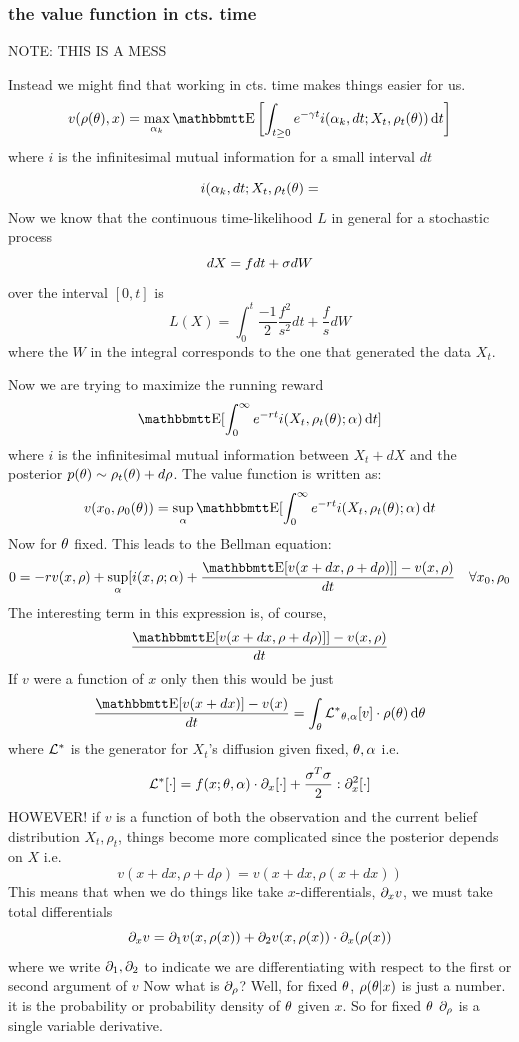 \documentclass{article}
\begin{document}
\subsubsection{the value function in cts. time}
NOTE: THIS IS A MESS

Instead we might find that working in cts. time makes things easier for us. 
\begin{equation}
v(\rho(\th), x) =
\max_{\a_k} \Exp\left[ \int_{t \geq 0} e^{-\g t}  i(\a_k, dt; X_t, \rho_t(\th))
\intd{t}\right]
\label{eq:mutual_info_objective_cts_time}
\end{equation}
where $i$ is the infinitesimal mutual information for a small interval $dt$

$$
i({\alpha}_k, dt; X_t, \rho_t({\theta}) = 
$$
Now we know that the continuous time-likelihood $L$ in general for a stochastic
process
$$
dX = f dt + {\sigma } dW
$$
over the interval $[0,t]$ is
$$
L(X) = \int_0^t \frac {-1}{2} \frac{f^2}{s^2} dt + \frac{f}{s}dW
$$
where the $W$ in the integral corresponds to the one that generated the data
$X_t$.

Now we are trying to maximize the running reward
$$
\Exp [ \int_0^\infty e^{-rt} i(X_t, \rho_t(\th); \a)\intd{t}]
$$
where $i$ is the infinitesimal mutual information between $X_t+dX$ and the
posterior $p({\theta}) \sim \rho_t({\theta}) + d\rho$.
The value function is written as: 
$$
v(x_0, \rho_0(\th)) = \sup_{\a} \Exp[\int_0^\infty e^{-rt} i(X_t, \rho_t(\th);
\a)\intd{t}
$$
Now for ${\theta}$ fixed. This leads to the Bellman equation:
$$
0 = -r v(x, \rho) +
 \sup_\a[ i(x, \rho; \a) +
 \frac{\Exp[v(x + dx, \rho + d\rho)]] - v(x,\rho)}{dt} \quad \forall
 x_0, \rho_0 $$ 
The interesting term in this expression is, of course, 
$$
\frac{\Exp[v(x + dx, \rho + d\rho)]] - v(x,\rho)}{dt}
$$
If $v$ were a function of $x$ only then this would be just
$$
\frac{\Exp[v(x + dx)] - v(x)}{dt} = \int_\th \Lstar_{\th, \a} [v] \cdot
\rho(\th) \intd{\th} $$
where ${ { \mathcal{L} }^* }$ is the generator for $X_t$'s diffusion given fixed, ${\theta},{\alpha}$
i.e.\
$$
{ { \mathcal{L} }^* } [\cdot] = f(x; {\theta}, {\alpha}) \cdot {\partial}_x[\cdot] + \frac{{\sigma }^T {\sigma } }{2}: {\partial}^2_x
[\cdot] $$
HOWEVER!
if $v$ is a function of both the observation and the current belief
distribution $X_t, \rho_t$, things become more complicated since the posterior
depends on $X$
i.e. 
$$
v(x+dx, \rho+d\rho) = v(x+dx, \rho(x+dx))
$$
This means that when we do things like take $x$-differentials, ${\partial}_x v$, we
must take total differentials
$$
{\partial}_x v =  {\partial}_1 v(x, \rho(x)) + {\partial}_2v(x, \rho(x)) \cdot {\partial}_x (\rho(x))
$$
where we write ${\partial}_1,{\partial}_2$ to indicate we are differentiating with respect to
the first or second argument of $v$
Now what is ${\partial}_\rho$? Well, for fixed ${\theta}$, $\rho({\theta}|x)$ is just a number.
it is the probability or probability density of ${\theta}$ given $x$. So for fixed
${\theta}$ ${\partial}_\rho$ is a single variable derivative.
\end{document}
